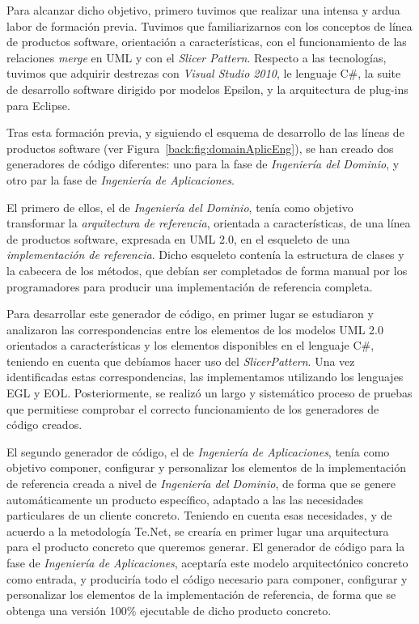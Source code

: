 Para alcanzar dicho objetivo, primero tuvimos que realizar una intensa y ardua labor de formación previa. Tuvimos que familiarizarnos con los conceptos de línea de productos software, orientación a características, con el funcionamiento de las relaciones \emph{merge} en UML y con el \emph{Slicer Pattern}. Respecto a las tecnologías, tuvimos que adquirir destrezas con \emph{Visual Studio 2010}, le lenguaje C\#, la suite de desarrollo software dirigido por modelos Epsilon, y la arquitectura de plug-ins para Eclipse.

Tras esta formación previa, y siguiendo el esquema de desarrollo de las líneas de productos software (ver Figura~\ref{back:fig:domainAplicEng}), se han creado dos generadores de código diferentes: uno para la fase de \emph{Ingeniería del Dominio}, y otro par la fase de \emph{Ingeniería de Aplicaciones}.

El primero de ellos, el de \emph{Ingeniería del Dominio}, tenía como objetivo transformar la \emph{arquitectura de referencia}, orientada a características, de una línea de productos software, expresada en UML 2.0, en el esqueleto de una \emph{implementación de referencia}. Dicho esqueleto contenía la estructura de clases y la cabecera de los métodos, que debían ser completados de forma manual por los programadores para producir una implementación de referencia completa.

Para desarrollar este generador de código, en primer lugar se estudiaron y analizaron las correspondencias entre los elementos de los modelos UML 2.0 orientados a características y los elementos disponibles en el lenguaje C\#, teniendo en cuenta que debíamos hacer uso del \emph{SlicerPattern}. Una vez identificadas estas correspondencias, las implementamos utilizando los lenguajes EGL y EOL. Posteriormente, se realizó un largo y sistemático proceso de pruebas que permitiese comprobar el correcto funcionamiento de los generadores de código creados.

El segundo generador de código, el de \emph{Ingeniería de Aplicaciones}, tenía como objetivo componer, configurar y personalizar los elementos de la implementación de referencia creada a nivel de \emph{Ingeniería del Dominio}, de forma que se genere automáticamente un producto específico, adaptado a las las necesidades particulares de un cliente concreto. Teniendo en cuenta esas necesidades, y de acuerdo a la metodología Te.Net, se crearía en primer lugar una arquitectura para el producto concreto que queremos generar. El generador de código para la fase de \emph{Ingeniería de Aplicaciones}, aceptaría este modelo arquitectónico concreto como entrada, y produciría todo el código necesario para componer, configurar y personalizar los elementos de la implementación de referencia, de forma que se obtenga una versión 100\% ejecutable de dicho producto concreto.


